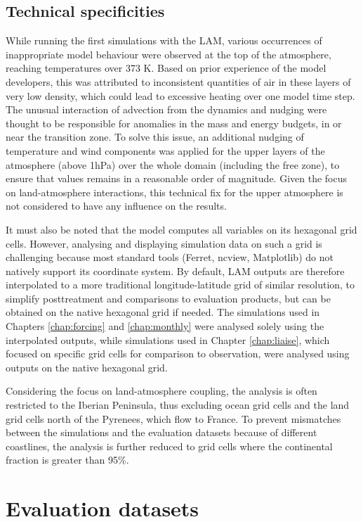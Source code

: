 \subsection{Technical specificities}

While running the first simulations with the LAM, various occurrences of inappropriate model behaviour were observed at the top of the atmosphere, reaching temperatures over 373 K. Based on prior experience of the model developers, this was attributed to inconsistent quantities of air in these layers of very low density, which could lead to excessive heating over one model time step. The unusual interaction of advection from the dynamics and nudging were thought to be responsible for anomalies in the mass and energy budgets, in or near the transition zone.
To solve this issue, an additional nudging of temperature and wind components was applied for the upper layers of the atmosphere (above 1hPa) over the whole domain (including the free zone), to ensure that values remains in a reasonable order of magnitude. Given the focus on land-atmosphere interactions, this technical fix for the upper atmosphere is not considered to have any influence on the results.

It must also be noted that the model computes all variables on its hexagonal grid cells. However, analysing and displaying simulation data on such a grid is challenging because most standard tools (Ferret, ncview, Matplotlib) do not natively support its coordinate system. 
By default, LAM outputs are therefore interpolated to a more traditional longitude-latitude grid of similar resolution, to simplify posttreatment and comparisons to evaluation products, but can be obtained on the native hexagonal grid if needed.
The simulations used in Chapters \ref{chap:forcing} and \ref{chap:monthly} were analysed solely using the interpolated outputs, while simulations used in Chapter \ref{chap:liaise}, which focused on specific grid cells for comparison to observation, were analysed using outputs on the native hexagonal grid.

Considering the focus on land-atmosphere coupling, the analysis is often restricted to the Iberian Peninsula, thus excluding ocean grid cells and the land grid cells north of the Pyrenees, which flow to France. To prevent mismatches between the simulations and the evaluation datasets because of different coastlines, the analysis is further reduced to grid cells where the continental fraction is greater than 95\%. 

\section{Evaluation datasets}
\label{sec:eval_datasets}

